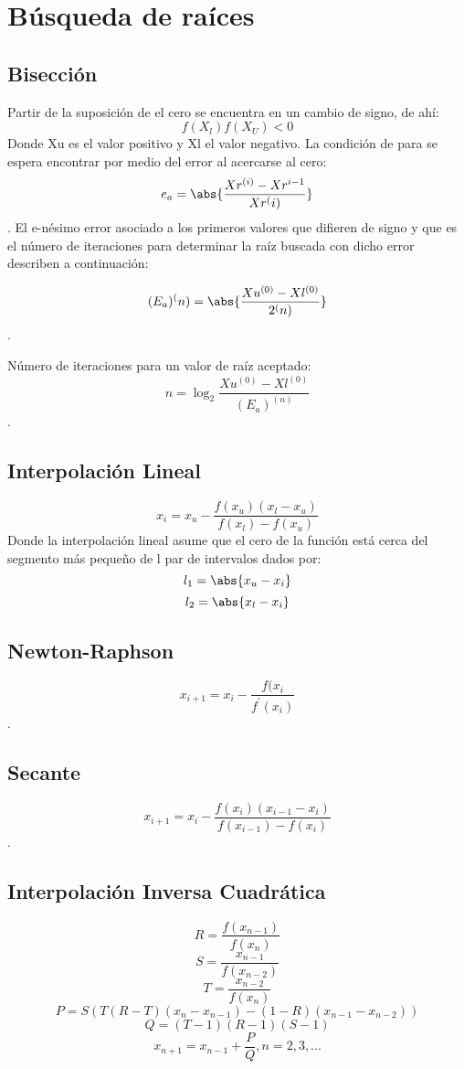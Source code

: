 \section{Búsqueda de raíces}
\subsection{Bisección}
	Partir de la suposición de el cero se encuentra en un cambio de signo, de ahí: 
    $$f(X_l)f(X_U)<0$$
    Donde Xu es el valor positivo y Xl el valor negativo.
    La condición de  para se espera encontrar por medio del error al acercarse al cero: 
    $$
    	e_a =\abs{ \frac{Xr^{(i)} - Xr^{i-1}}{ Xr^(i)} }  
	$$.
    El e-nésimo error asociado a los primeros valores que difieren de signo y que es el número de iteraciones para determinar la raíz buscada  con dicho error describen a continuación: 
    
    $$
    	(E_a)^(n) =\abs{ \frac{Xu^{(0)} - Xl^{(0)}}{ 2^(n)} }  
	$$.
    
    Número de iteraciones para un valor de raíz aceptado:
    $$
    	n =\log_{2}{ \frac{Xu^{(0)} - Xl^{(0)}}{(E_a)^(n) }   }
	$$.
    
 \subsection{Interpolación Lineal}
   $$
    	x_i =x_u - { \frac{ f(x_u)(x_l-x_u)}{f(x_l) -f(x_u) } }
	$$ Donde la interpolación lineal asume que el cero de la función está cerca del segmento más pequeño de l par de intervalos dados por: 
    	$$ l_1 = \abs{x_u - x_i }  $$ $$  l_2  = \abs{x_l - x_i } $$
  \subsection {Newton-Raphson}
  	$$
    	x_{i+1} = x_i - \frac{f(x_i}{f^{'}(x_i)}
	$$.
 \subsection {Secante}
  	$$
    	x_{i+1} = x_i - \frac{f(x_i)(x_{i-1} -x_i) }    {f(x_{i-1})-f(x_i)}
	$$.
    
 \subsection {Interpolación Inversa Cuadrática}
 	$$    
    R = \frac{f(x_{n-1})} {f(x_n)}
    $$
    $$    
    S = \frac{x_{n-1}}{f(x_{n-2})}
    $$
    $$    
    T = \frac{x_{n-2}}{f(x_{n})}
    $$
    $$    
    P  =  S ( T ( R -T)(x_n-x_{n-1}) -(1-R)(x_{n-1}- x_{n-2}))
    $$
    $$    
    Q = (T-1)(R-1)(S-1)
    $$
    $$    
    x_{n+1} = x_{n-1} + \frac{P}{Q} , n = 2,3,...
    $$
 
